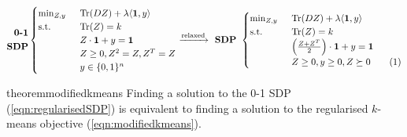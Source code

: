 \documentclass[12pt]{article}
\newcommand{\mb}{\mathbf}
\newcommand{\tr}{\text{Tr}}
\newcommand\numberthis{\addtocounter{equation}{1}\tag{\theequation}}
\begin{document}
\begin{equation*}
	\begin{split}
	\textbf{0-1}\\
	\textbf{SDP}
  \end{split}
	\begin{cases}
		\min_{Z, y} \enspace &\tr(DZ) + \lambda \langle \mb 1, y\rangle\\
		\text{s.t. } \enspace &\tr(Z) = k\\
		& Z\cdot \mb 1 + y = \mb 1\\	
		&Z\ge 0, Z^2 = Z, Z^T = Z \\
		& y \in \{0, 1\}^n
	\end{cases}
	\xrightarrow{\text{relaxed}} \textbf{ SDP } 
	\begin{cases}
		\min_{Z, y} \enspace &\tr(DZ) + \lambda \langle \mb 1, y\rangle\\
        \text{s.t. } \enspace &\tr(Z) = k\\
		& \Big(\frac{Z+Z^T}{2}\Big)\cdot \mb 1 + y = \mb 1\\		
		&Z \ge 0, y \ge 0, Z \succeq 0 \numberthis\label{a-eqn:regularisedSDP}
	\end{cases}
\end{equation*}

\begin{restatable}{theorem}{modifiedkmeans}
\label{a-thm:modifiedkmeans}
Finding a solution to the 0-1 SDP (\ref{eqn:regularisedSDP}) is equivalent to finding a solution to the regularised $k$-means objective (\ref{eqn:modifiedkmeans}). 
\end{restatable}
\end{document}
